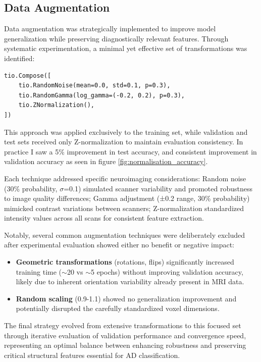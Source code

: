 \documentclass[12pt, a4paper]{article}
\begin{document}
\subsection{Data Augmentation}

Data augmentation was strategically implemented to improve model generalization while preserving diagnostically relevant features. Through systematic experimentation, a minimal yet effective set of transformations was identified:

\begin{verbatim}
tio.Compose([
    tio.RandomNoise(mean=0.0, std=0.1, p=0.3),
    tio.RandomGamma(log_gamma=(-0.2, 0.2), p=0.3),
    tio.ZNormalization(),
])
\end{verbatim}

This approach was applied exclusively to the training set, while validation and test sets received only Z-normalization to maintain evaluation consistency. In practice I saw a 5\% improvement in test accuracy, and consistent improvement in validation accuracy as seen in figure \ref{fig:normalisation_accuracy}.

Each technique addressed specific neuroimaging considerations: Random noise (30\% probability, $\sigma$=0.1) simulated scanner variability and promoted robustness to image quality differences; Gamma adjustment (±0.2 range, 30\% probability) mimicked contrast variations between scanners; Z-normalization standardized intensity values across all scans for consistent feature extraction.

Notably, several common augmentation techniques were deliberately excluded after experimental evaluation showed either no benefit or negative impact:

\begin{itemize}
    \item \textbf{Geometric transformations} (rotations, flips) significantly increased training time ($\sim$20 vs $\sim$5 epochs) without improving validation accuracy, likely due to inherent orientation variability already present in MRI data.
    
    \item \textbf{Random scaling} (0.9-1.1) showed no generalization improvement and potentially disrupted the carefully standardized voxel dimensions.
\end{itemize}

The final strategy evolved from extensive transformations to this focused set through iterative evaluation of validation performance and convergence speed, representing an optimal balance between enhancing robustness and preserving critical structural features essential for AD classification.
\end{document}
